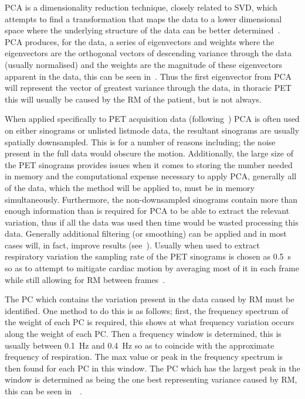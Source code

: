                 \gls{PCA} is a dimensionality reduction technique, closely related to \gls{SVD}, which attempts to find a transformation that maps the data to a lower dimensional space where the underlying structure of the data can be better determined~. \gls{PCA} produces, for the data, a series of eigenvectors and weights where the eigenvectors are the orthogonal vectors of descending variance through the data (usually normalised) and the weights are the magnitude of these eigenvectors apparent in the data, this can be seen in~. Thus the first eigenvector from \gls{PCA} will represent the vector of greatest variance through the data, in thoracic \gls{PET} this will usually be caused by the \gls{RM} of the patient, but is not always.
                
                When applied specifically to \gls{PET} acquisition data (following~) \gls{PCA} is often used on either sinograms or unlisted listmode data, the resultant sinograms are usually spatially downsampled. This is for a number of reasons including; the noise present in the full data would obscure the motion. Additionally, the large size of the \gls{PET} sinograms provides issues when it comes to storing the number needed in memory and the computational expense necessary to apply \gls{PCA}, generally all of the data, which the method will be applied to, must be in memory simultaneously. Furthermore, the non-downsampled sinograms contain more than enough information than is required for \gls{PCA} to be able to extract the relevant variation, thus if all the data was used then time would be wasted processing this data. Generally additional filtering (or smoothing) can be applied and in most cases will, in fact, improve results (see~). Usually when used to extract respiratory variation the sampling rate of the \gls{PET} sinograms is chosen as \SI{0.5}{\second} so as to attempt to mitigate cardiac motion by averaging most of it in each frame while still allowing for \gls{RM} between frames~.
                
                The \gls{PC} which contains the variation present in the data caused by \gls{RM} must be identified. One method to do this is as follows; first, the frequency spectrum of the weight of each \gls{PC} is required, this shows at what frequency variation occurs along the weight of each \gls{PC}. Then a frequency window is determined, this is usually between \SI{0.1}{\hertz} and \SI{0.4}{\hertz} so as to coincide with the approximate frequency of respiration. The max value or peak in the frequency spectrum is then found for each \gls{PC} in this window. The \gls{PC} which has the largest peak in the window is determined as being the one best representing variance caused by \gls{RM}, this can be seen in~~.
                
